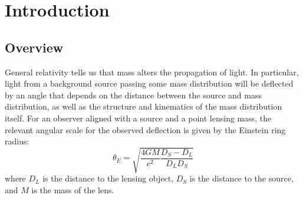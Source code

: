 \documentclass[12pt,preprint]{aastex}
\newcommand{\apwsim}{\raisebox{0.2ex}{\scriptsize$\sim$\normalsize}}
\begin{document}
\begin{abstract}
[APW: update the abstract..]
Many current photometric, time-domain surveys are driven by specific goals, such as supernova searches, transiting exoplanet discoveries, or stellar variability studies, which set the cadence with which individual fields get re-imaged. In the case of the Palomar Transient Factory (PTF), several such sub-surveys are being conducted in parallel, leading to an extremely non-uniform sampling gradient over the survey footprint of nearly 20,000 deg$^2$: while the typical 7.26~deg$^2$ PTF field has been imaged 15 times, \apwsim1000~deg$^2$ of the survey has been observed more than 150 times. We use the existing PTF data to study the trade-off between a large survey footprint and irregular sampling when searching for microlensing events, and to examine the probability that such events can be recovered in these data. We conduct Monte Carlo simulations to evaluate our detection efficiency in a hypothetical survey field as a function of both the baseline and number of observations. We also apply variability statistics to systematically differentiate between periodic, transient, and flat light curves. Preliminary results suggest that both recovery and discovery of microlensing events are possible with a careful consideration of photometric systematics. This work can help inform predictions about the observability of microlensing signals in future wide-field time-domain surveys such as that of LSST.
	
\end{abstract}


\section{Introduction}

\subsection{Overview}
General relativity tells us that mass alters the propagation of light. In particular, light from a background source passing some mass distribution will be deflected by an angle that depends on the distance between the source and mass distribution, as well as the structure and kinematics of the mass distribution itself. For an observer aligned with a source and a point lensing mass, the relevant angular scale for the observed deflection is given by the Einstein ring radius:
\begin{equation} \label{eq:einstein_radius}
	\theta_E = \sqrt{\frac{4GM}{c^2}\frac{D_{S} - D_L}{D_L D_S}}
\end{equation}
where $D_L$ is the distance to the lensing object, $D_S$ is the distance to the source, and $M$ is the mass of the lens. 
\end{document}
